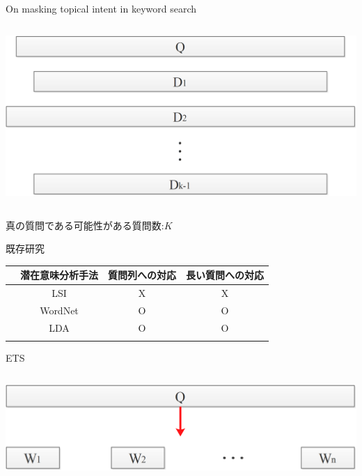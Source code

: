 \documentclass[14pt,xcolor=dvipsnames,table,dvipdfmx]{beamer}
\begin{document}
\begin{frame}{On masking topical intent in keyword search \cite{masking2014}}
	\begin{columns}[t]
		\begin{column}{0.8\textwidth} %
			\includegraphics[width=\columnwidth]{rk6.png}
		\end{column}
	\end{columns}
	\begin{block}{}
		真の質問である可能性がある質問数:$K$	
	\end{block}
\end{frame}

\begin{frame}{既存研究}
    \begin{block}{}
        \fontsize{8pt}{7.2}\selectfont
        \begin{tabular}{cccc}
        \noalign{\hrule height 1pt}
         & 潜在意味分析手法 & 質問列への対応 & 長い質問への対応  \\
        \hline
        \cite{providing2009} & LSI   & X & X \\ 
        \cite{embellishing2010} & WordNet  & O & O \\
        \cite{masking2014} & LDA & O & O \\
        \noalign{\hrule height 1pt}
        \end{tabular}
    \end{block}
\end{frame}

\begin{frame}{ETS}
	\begin{columns}[t]
		\begin{column}{0.8\textwidth} %
			\includegraphics[width=\columnwidth]{rk7.png}
		\end{column}
	\end{columns}
\end{frame}
\end{document}

